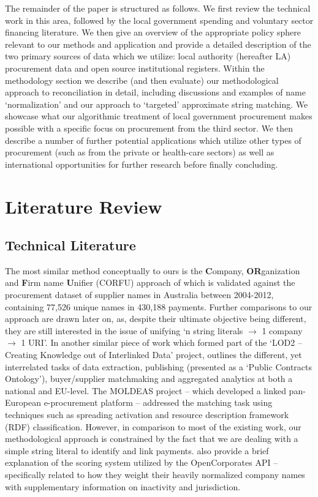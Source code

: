 \documentclass[11pt]{article}
\begin{document}
The remainder of the paper is structured as follows. We first review the technical work in this area, followed by the local government spending and voluntary sector financing literature. We then give an overview of the appropriate policy sphere relevant to our methods and application and provide a detailed description of the two primary sources of data which we utilize: local authority (hereafter LA) procurement data and open source institutional registers. Within the methodology section we describe (and then evaluate) our methodological approach to reconciliation in detail, including discussions and examples of name `normalization' and our approach to `targeted' approximate string matching. We showcase what our algorithmic treatment of local government procurement makes possible with a specific focus on procurement from the third sector. We then describe a number of further potential applications which utilize other types of procurement (such as from the private or health-care sectors) as well as international opportunities for further research before finally concluding. 

\section{Literature Review}\label{litreview}

\subsection{Technical Literature}

The most similar method conceptually to ours is the \textbf{C}ompany, \textbf{OR}ganization and \textbf{F}irm name \textbf{U}nifier (CORFU) approach of \cite{corfu2015} which is validated against the procurement dataset of supplier names in Australia between 2004-2012, containing 77,526 unique names in 430,188 payments. Further comparisons to our approach are drawn later on, as, despite their ultimate objective being different, they are still interested in the issue of unifying `n string literals $\rightarrow$ 1 company $\rightarrow$ 1 URI'. In another similar piece of work which formed part of the `LOD2 -- Creating Knowledge out of Interlinked Data’ project, \cite{Svatek2014} outlines the different, yet interrelated tasks of data extraction, publishing (presented as a `Public Contracts Ontology'), buyer/supplier matchmaking and aggregated analytics at both a national and EU-level. The MOLDEAS project -- which developed a linked pan-European e-procurement platform \citep[outlined in][]{moldeas2012} -- addressed the matching task using techniques such as spreading activation and resource description framework (RDF) classification. However, in comparison to most of the existing work, our methodological approach is constrained by the fact that we are dealing with a simple string literal to identify and link payments. \cite{OCref} also provide a brief explanation of the scoring system utilized by the OpenCorporates API -- specifically related to how they weight their heavily normalized company names with supplementary information on inactivity and jurisdiction.
\end{document}
